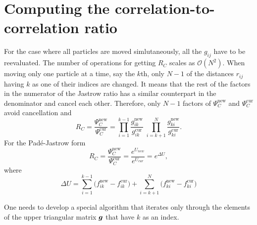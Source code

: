 \section{Computing the correlation-to-correlation ratio}\label{jastrowJastrowDer}
For the case where all particles are moved simlutaneously, all the $g_{ij}$ have to be reevaluated. The number of operations for getting $R_{C}$ scales as $\mathcal{O}(N^2)$\cite{Roestad}. When moving only one particle at a time, say the $k$th, only $N-1$ of the distances $r_{ij}$ having $k$ as one of their indices are changed. It means that the rest of the factors in the numerator of the Jastrow ratio has a similar counterpart in the denominator and cancel each other. Therefore, only $N-1$ factors of $\Psi_{C}^\mathrm{new}$ and $\Psi_{C}^\mathrm{cur}$ avoid cancellation and 
\begin{equation}\label{RjfRatio}
 \boxed{R_{C} = \frac{\Psi_{C}^\mathrm{new}}{\Psi_{C}^\mathrm{cur}} =
\prod_{i=1}^{k-1}\frac{g_{ik}^\mathrm{new}}{g_{ik}^\mathrm{cur}}\;
\prod_{i=k+1}^{N}\frac{g_{ki}^\mathrm{new}}{g_{ki}^\mathrm{cur}}}.
\end{equation}\label{padepadeRatio}
For the Pad\'e-Jastrow form
\begin{equation}
 \boxed{R_{C} = \frac{\Psi_{C}^\mathrm{new}}{\Psi_{C}^\mathrm{cur}} = \frac{e^{U_{new}}}{e^{U_{cur}}} = e^{\Delta U},}
\end{equation}
where
\begin{equation}
\Delta U =
\sum_{i=1}^{k-1}\big(f_{ik}^\mathrm{new}-f_{ik}^\mathrm{cur}\big)
+
\sum_{i=k+1}^{N}\big(f_{ki}^\mathrm{new}-f_{ki}^\mathrm{cur}\big)
\end{equation}

One needs to develop a special algorithm 
that iterates only through the elements of the upper triangular
matrix $\boldsymbol{g}$ that have $k$ as an index. 

